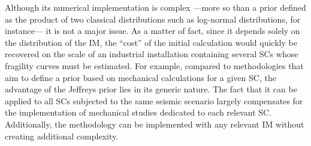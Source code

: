 
Although its numerical implementation is complex ---more so than a prior defined as the product of two classical distributions such as log-normal distributions, for instance--- it is not a major issue. As a matter of fact, since it depends solely on the distribution of the IM, the ``cost'' of the initial calculation would quickly be recovered on the scale of an industrial installation containing several SCs whose fragility curves must be estimated. {For example, compared to methodologies that aim to define a prior based on mechanical calculations for a given SC, the advantage of the Jeffreys prior lies in its generic nature. The fact that it can be applied to all SCs subjected to the same seismic scenario largely compensates for the implementation of mechanical studies dedicated to each relevant SC. Additionally, the methodology can be implemented with any relevant IM without creating additional complexity.}













